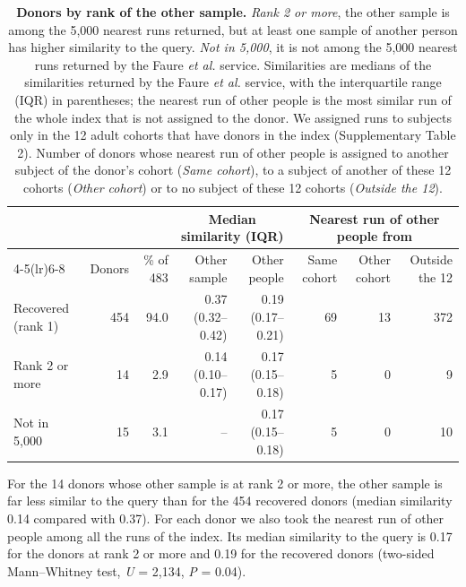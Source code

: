\documentclass[11pt,a4paper]{article}
\begin{document}
\setcounter{table}{9}
\begin{table}[!htbp]\centering\footnotesize\setlength{\tabcolsep}{2.2pt}
\caption[Donors by rank of the other sample]{\textbf{Donors by rank of the other sample.} \textit{Rank 2 or more}, the other sample is among the 5,000 nearest runs returned, but at least one sample of another person has higher similarity to the query. \textit{Not in 5,000}, it is not among the 5,000 nearest runs returned by the Faure \textit{et al.} service. Similarities are medians of the similarities returned by the Faure \textit{et al.} service, with the interquartile range (IQR) in parentheses; the nearest run of other people is the most similar run of the whole index that is not assigned to the donor. We assigned runs to subjects only in the 12 adult cohorts that have donors in the index (Supplementary Table 2). Number of donors whose nearest run of other people is assigned to another subject of the donor's cohort (\textit{Same cohort}), to a subject of another of these 12 cohorts (\textit{Other cohort}) or to no subject of these 12 cohorts (\textit{Outside the 12}).}
\begin{tabular}{lrrrrrrr}
\toprule
 & & & \multicolumn{2}{c}{Median similarity (IQR)} & \multicolumn{3}{c}{Nearest run of other people from} \\
\cmidrule(lr){4-5}\cmidrule(lr){6-8}
 & Donors & \% of 483 & Other sample & Other people & Same cohort & Other cohort & Outside the 12 \\
\midrule
Recovered (rank 1) & 454 & 94.0 & 0.37 (0.32--0.42) & 0.19 (0.17--0.21) & 69 & 13 & 372 \\
Rank 2 or more & 14 & 2.9 & 0.14 (0.10--0.17) & 0.17 (0.15--0.18) & 5 & 0 & 9 \\
Not in 5,000 & 15 & 3.1 & -- & 0.17 (0.15--0.18) & 5 & 0 & 10 \\
\bottomrule
\end{tabular}
\end{table}

For the 14 donors whose other sample is at rank 2 or more, the other sample is far less similar to the query than for the 454 recovered donors (median similarity 0.14 compared with 0.37). For each donor we also took the nearest run of other people among all the runs of the index. Its median similarity to the query is 0.17 for the donors at rank 2 or more and 0.19 for the recovered donors (two-sided Mann--Whitney test, \textit{U} = 2,134, \textit{P} = 0.04). 
\end{document}
